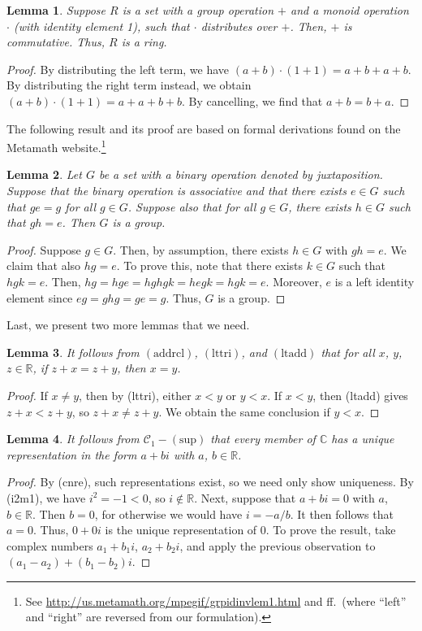 \documentclass{article}
\newcommand\bC{\mathbb{C}}
\newcommand\bR{\mathbb{R}}
\newcommand\cC{\mathcal{C}}
\newtheorem{lemma}{Lemma}[section]
\begin{document}
\begin{lemma}
\label{ringabl}
Suppose $R$ is a set with a group operation $+$ and a monoid operation $\cdot$ (with identity element 1), such that $\cdot$ distributes over $+$. Then, $+$ is commutative. Thus, $R$ is a ring.
\end{lemma}
\begin{proof}
By distributing the left term, we have $(a + b) \cdot (1 + 1) = a + b + a + b$. By distributing the right term instead, we obtain $(a + b) \cdot (1 + 1) = a + a + b + b$. By cancelling, we find that $a + b = b + a$.
\end{proof}

The following result and its proof are based on formal derivations found on the Metamath website.\footnote{See \url{http://us.metamath.org/mpegif/grpidinvlem1.html} and f{}f.~(where ``left'' and ``right'' are reversed from our formulation).}

\begin{lemma}
\label{isgrp}
Let $G$ be a set with a binary operation denoted by juxtaposition. Suppose that the binary operation is associative and that there exists $e \in G$ such that $ge = g$ for all $g \in G$. Suppose also that for all $g \in G$, there exists $h \in G$ such that $gh = e$. Then $G$ is a group.
\end{lemma}
\begin{proof}
Suppose $g \in G$. Then, by assumption, there exists $h \in G$ with $gh = e$. We claim that also $hg = e$. To prove this, note that there exists $k \in G$ such that $hgk = e$. Then, $hg = hge = hghgk = hegk = hgk = e$. Moreover, $e$ is a left identity element since $eg = ghg = ge = g$. Thus, $G$ is a group.
\end{proof}

Last, we present two more lemmas that we need.

\begin{lemma}
\label{addcancel}
It follows from $\mathrm{(addrcl)}$, $\mathrm{(lttri)}$, and $\mathrm{(ltadd)}$ that for all $x$, $y$, $z \in \bR$, if $z + x = z + y$, then $x = y$.
\end{lemma}
\begin{proof}
If $x \ne y$, then by (lttri), either $x < y$ or $y < x$. If $x < y$, then (ltadd) gives $z + x < z + y$, so $z + x \ne z + y$. We obtain the same conclusion if $y < x$.
\end{proof}

\begin{lemma}
\label{cnreunique}
It follows from $\cC_1 - \mathrm{(sup)}$ that every member of $\bC$ has a unique representation in the form $a + bi$ with $a$, $b \in \bR$.
\end{lemma}
\begin{proof}
By (cnre), such representations exist, so we need only show uniqueness. By (i2m1), we have $i^2 = -1 < 0$, so $i \notin \bR$. Next, suppose that $a + bi = 0$ with $a$, $b \in \bR$. Then $b = 0$, for otherwise we would have $i = -a/b$. It then follows that $a = 0$. Thus, $0 + 0i$ is the unique representation of $0$. To prove the result, take complex numbers $a_1 + b_1i$, $a_2 + b_2i$, and apply the previous observation to $(a_1 - a_2) + (b_1 - b_2)i$.
\end{proof}
\end{document}
